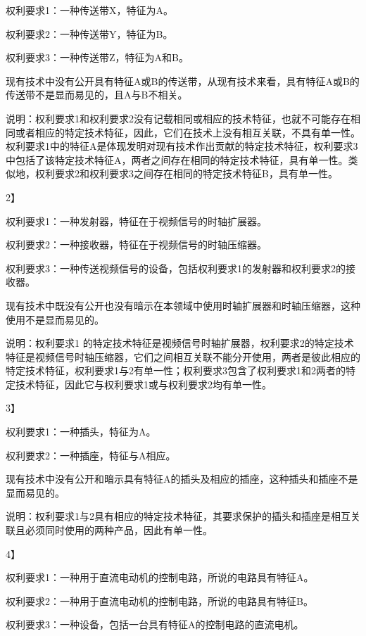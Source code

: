权利要求1：一种传送带X，特征为A。

权利要求2：一种传送带Y，特征为B。

权利要求3：一种传送带Z，特征为A和B。

现有技术中没有公开具有特征A或B的传送带，从现有技术来看，具有特征A或B的传送带不是显而易见的，且A与B不相关。

说明：权利要求1和权利要求2没有记载相同或相应的技术特征，也就不可能存在相同或者相应的特定技术特征，因此，它们在技术上没有相互关联，不具有单一性。权利要求1中的特征A是体现发明对现有技术作出贡献的特定技术特征，权利要求3中包括了该特定技术特征A，两者之间存在相同的特定技术特征，具有单一性。类似地，权利要求2和权利要求3之间存在相同的特定技术特征B，具有单一性。

{2{\kaiti 】}\par}

权利要求1：一种发射器，特征在于视频信号的时轴扩展器。

权利要求2：一种接收器，特征在于视频信号的时轴压缩器。

权利要求3：一种传送视频信号的设备，包括权利要求1的发射器和权利要求2的接收器。

现有技术中既没有公开也没有暗示在本领域中使用时轴扩展器和时轴压缩器，这种使用不是显而易见的。

说明：权利要求1 的特定技术特征是视频信号时轴扩展器，权利要求2的特定技术特征是视频信号时轴压缩器，它们之间相互关联不能分开使用，两者是彼此相应的特定技术特征，权利要求1与2有单一性；权利要求3包含了权利要求1和2两者的特定技术特征，因此它与权利要求1或与权利要求2均有单一性。

{3{\kaiti 】}\par}

权利要求1：一种插头，特征为A。

权利要求2：一种插座，特征与A相应。

现有技术中没有公开和暗示具有特征A的插头及相应的插座，这种插头和插座不是显而易见的。

说明：权利要求1与2具有相应的特定技术特征，其要求保护的插头和插座是相互关联且必须同时使用的两种产品，因此有单一性。

{4{\kaiti 】}\par}

权利要求1：一种用于直流电动机的控制电路，所说的电路具有特征A。

权利要求2：一种用于直流电动机的控制电路，所说的电路具有特征B。

权利要求3：一种设备，包括一台具有特征A的控制电路的直流电机。

